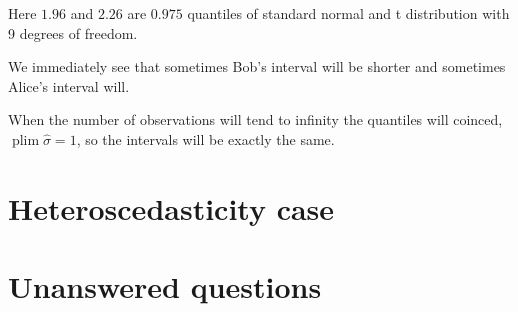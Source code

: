 \documentclass[10pt, a4paper]{article}
\DeclareMathOperator*\plim{plim}
\begin{document}
Here $1.96$ and $2.26$ are $0.975$ quantiles of 
standard normal and t distribution with 9 degrees of freedom. 


We immediately see that sometimes Bob's interval will be shorter and sometimes Alice's interval will. 

When the number of observations will tend to infinity the quantiles will coinced, 
$\plim \hat\sigma =1$, 
so the intervals will be exactly the same. 


\section{Heteroscedasticity case}


\section{Unanswered questions}
\end{document}
